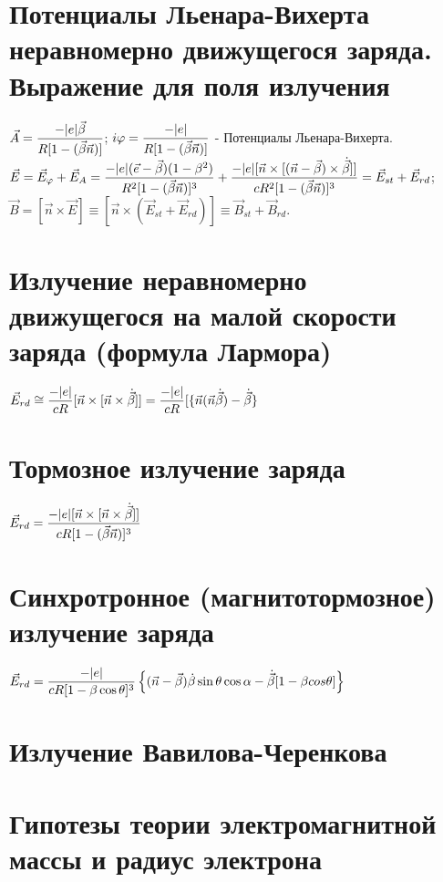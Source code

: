 \begin{multicols*}{2}
		\section{Потенциалы Льенара-Вихерта неравномерно движущегося заряда. Выражение для поля излучения}
		$\vec{A}=\dfrac{-\abs{e}\vec{\beta}}{R[1-(\vec \beta \vec n)]}$; 
		$i\varphi=\dfrac{-\abs{e}}{R[1-(\vec \beta \vec n)]}$ - Потенциалы Льенара-Вихерта.\\
		$\vec E = \vec E_\varphi + \vec E_A = \dfrac{-\abs{e}(\vec e - \vec \beta)(1-\beta^2)}{R^2[1-(\vec \beta \vec n)]^3}+\dfrac{-\abs{e}[\vec n \times [(\vec n - \vec \beta)\times \dot{\vec \beta}]]}{cR^2[1-(\vec \beta \vec n)]^3}=\vec E_{st} + \vec E_{rd}$;\\
		$\vec B = [\vec n \times \vec E] \equiv [\vec n \times (\vec E_{st} + \vec E_{rd})] \equiv \vec B_{st} + \vec B_{rd}$.
		
		\section{Излучение неравномерно движущегося на малой скорости заряда (формула Лармора)}
		$\vec E_{rd} \cong \dfrac{-\abs{e}}{cR}[\vec n \times [\vec n \times \dot {\vec \beta}]] = \dfrac{-\abs{e}}{cR}[\{\vec n 
		(\vec n \dot {\vec \beta})-\dot {\vec \beta}\}$
		
		\section{Тормозное излучение заряда}
		$\vec E_{rd} = \dfrac{-\abs{e}[\vec n \times [\vec n \times \dot {\vec \beta}]]}{cR[1-(\vec \beta \vec n)]^3}$
		
		\section{Синхротронное (магнитотормозное) излучение заряда}
		$\vec E_{rd} = \dfrac{-\abs{e}}{cR[1-\beta \cos \theta]^3} \left\{ (\vec n - \vec \beta) \dot \beta \sin \theta \cos \alpha - \dot{\vec \beta} [1-\beta cos \theta] \right\} $
		
		\section{Излучение Вавилова-Черенкова}
		
		\section{Гипотезы теории электромагнитной массы и радиус электрона}
		

\end{multicols*}
